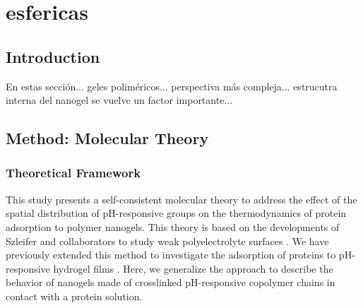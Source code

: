 \chapter{esfericas}

\section{Introduction}


En estas secci\'on... geles polim\'ericos... perspectiva m\'as compleja... estrucutra interna del nanogel se vuelve un factor importante...


\section{Method: Molecular Theory}



\subsection{Theoretical Framework}\label{sect:theory}


 

This study presents a self-consistent molecular theory to address the effect of the spatial distribution of pH-responsive groups on the thermodynamics of  protein adsorption to polymer nanogels.
This theory is based on the developments of Szleifer and collaborators to study weak polyelectrolyte surfaces .
We have previously extended this method to investigate the adsorption of proteins to pH-responsive hydrogel films .
Here, we generalize the approach to describe the behavior of nanogels made of crosslinked pH-responsive copolymer chains in contact with a protein solution.
 


